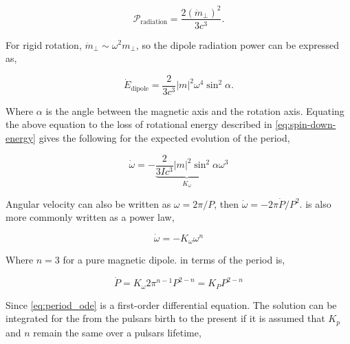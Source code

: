 \begin{equation}
    \mathcal{P_{\mathrm{radiation}}} = \frac{2 (\ddot m_\perp)^2}{3c^3}.
\end{equation}




For rigid rotation, $\ddot m_\perp \sim \omega^2 m_\perp$, so the dipole radiation power can be expressed as, 

\begin{equation}
    \dot E_{\text{dipole}} = \frac{2}{3c^3} |m|^2 \omega^4 \sin^2 \alpha. 
    \label{eq:dipole_Ediff}
\end{equation}

Where $\alpha$ is the angle between the magnetic axis and the rotation axis. Equating the above equation to the loss of rotational energy described in \cref{eq:spin-down-energy} gives the following for the expected evolution of the period,

\begin{equation}
    \dot \omega = - \underbrace{\frac{2}{3Ic^3} |m|^2\sin^2 \alpha}_{K_\omega}  \omega^3 
    \label{eq:angular_velocity_der}
\end{equation}

Angular velocity can also be written as $\omega = 2\pi/P$, then $\dot \omega =  -2 \pi \dot P/P^2$.  is also more commonly written as a power law, 

\begin{equation}
    \dot \omega = -K_\omega  \omega^n 
    \label{eq:spin-down-power-law}
\end{equation}

Where $n=3$ for a pure magnetic dipole.  in terms of the period is,

\begin{equation}
    \dot P = K_\omega  2 \pi^{n-1}P^{2-n}=K_P  P^{2-n}
    \label{eq:period_ode}
\end{equation}

Since \cref{eq:period_ode} is a first-order differential equation. The solution can be integrated for the from the pulsars birth to the present if it is assumed that $K_p$ and $n$ remain the same over a pulsars lifetime,

